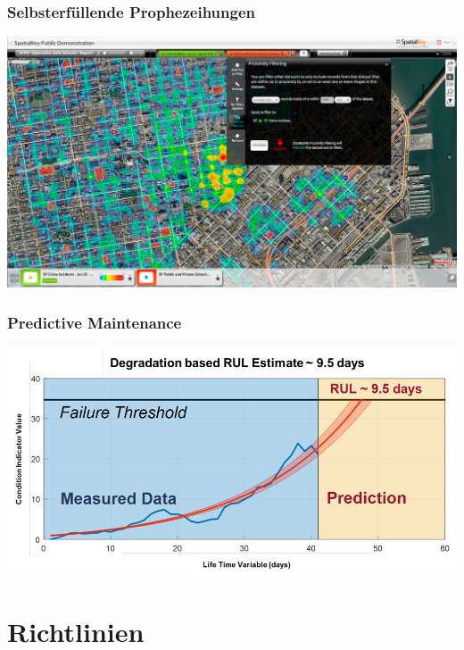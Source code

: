 \documentclass[aspectratio=169,xcolor=dvipsnames]{beamer}
\begin{document}
\begin{frame}
\frametitle{Selbsterfüllende Prophezeihungen}
\begin{center}
\includegraphics[height=0.7\paperheight,keepaspectratio]{images/predictive_policing} 
\end{center}
\end{frame}

\begin{frame}
\frametitle{Predictive Maintenance}
\begin{center}
\includegraphics[height=0.7\paperheight,keepaspectratio]{images/rul_threshold} 
\end{center}
\end{frame}

\section{Richtlinien}
\end{document}
